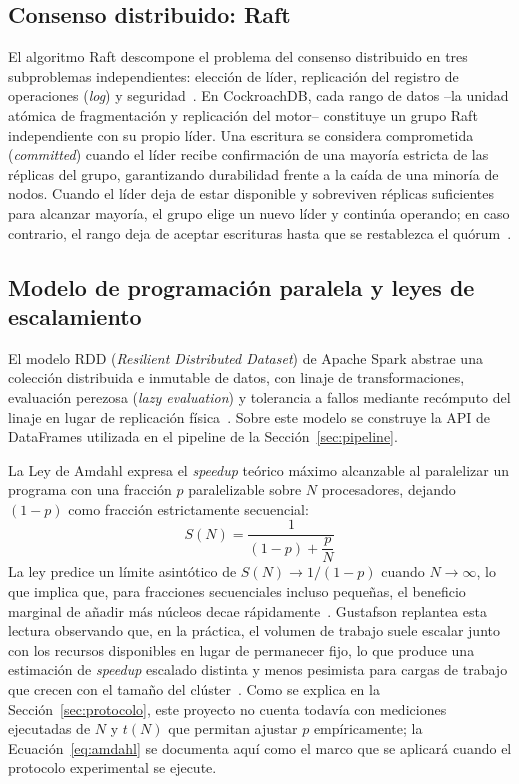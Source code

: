 \documentclass[10pt,twocolumn]{article}
\begin{document}
\subsection{Consenso distribuido: Raft}
\label{sec:consenso}

El algoritmo Raft descompone el problema del consenso distribuido en tres
subproblemas independientes: elección de líder, replicación del registro de
operaciones (\emph{log}) y seguridad~\cite{huang2020tidb}. En CockroachDB, cada
rango de datos --la unidad atómica de fragmentación y replicación del
motor-- constituye un grupo Raft independiente con su propio líder. Una
escritura se considera comprometida (\emph{committed}) cuando el líder
recibe confirmación de una mayoría estricta de las réplicas del grupo,
garantizando durabilidad frente a la caída de una minoría de nodos. Cuando
el líder deja de estar disponible y sobreviven réplicas suficientes para
alcanzar mayoría, el grupo elige un nuevo líder y continúa operando; en caso
contrario, el rango deja de aceptar escrituras hasta que se restablezca el
quórum~\cite{huang2020tidb}.

\subsection{Modelo de programación paralela y leyes de escalamiento}

El modelo RDD (\emph{Resilient Distributed Dataset}) de Apache Spark
abstrae una colección distribuida e inmutable de datos, con linaje de
transformaciones, evaluación perezosa (\emph{lazy evaluation}) y tolerancia
a fallos mediante recómputo del linaje en lugar de replicación
física~\cite{wang2022spark}. Sobre este modelo se construye la API de
DataFrames utilizada en el pipeline de la Sección~\ref{sec:pipeline}.

La Ley de Amdahl expresa el \emph{speedup} teórico máximo alcanzable al
paralelizar un programa con una fracción $p$ paralelizable sobre $N$
procesadores, dejando $(1-p)$ como fracción estrictamente secuencial:
\begin{equation}
S(N) = \frac{1}{(1-p) + \dfrac{p}{N}}
\label{eq:amdahl}
\end{equation}
La ley predice un límite asintótico de $S(N) \to 1/(1-p)$ cuando
$N \to \infty$, lo que implica que, para fracciones secuenciales incluso
pequeñas, el beneficio marginal de añadir más núcleos decae
rápidamente~\cite{poolla2023amdahl}. Gustafson replantea esta lectura observando
que, en la práctica, el volumen de trabajo suele escalar junto con los
recursos disponibles en lugar de permanecer fijo, lo que produce una
estimación de \emph{speedup} escalado distinta y menos pesimista para
cargas de trabajo que crecen con el tamaño del clúster~\cite{sun2023gustafson}.
Como se explica en la Sección~\ref{sec:protocolo}, este proyecto no cuenta
todavía con mediciones ejecutadas de $N$ y $t(N)$ que permitan ajustar $p$
empíricamente; la Ecuación~\eqref{eq:amdahl} se documenta aquí como el marco
que se aplicará cuando el protocolo experimental se ejecute.
\end{document}
